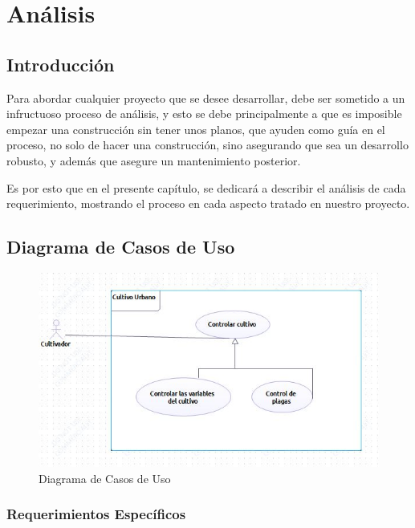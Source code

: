 \chapter{Análisis}

\section{Introducción}

Para abordar cualquier proyecto que se desee desarrollar, debe ser sometido a un infructuoso proceso de análisis, y esto se debe principalmente a que es imposible empezar una construcción sin tener unos planos, que ayuden como guía en el proceso, no solo de hacer una construcción, sino asegurando que sea un desarrollo robusto, y además que asegure un mantenimiento posterior.

Es por esto que en el presente capítulo, se dedicará a describir el análisis de cada requerimiento, mostrando el proceso en cada aspecto tratado en nuestro proyecto.

\section{Diagrama de Casos de Uso}

\begin{figure}[h!]
	\centering
	\includegraphics[width=1.2\linewidth]{proyecto/imgs/Caso de uso}
	\caption{Diagrama de Casos de Uso}
	\label{fig:cronograma}
\end{figure}


\subsection{Requerimientos Específicos}



